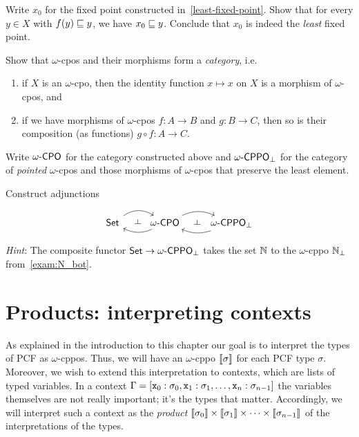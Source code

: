 \begin{exercise}\label{exer:least-fixed-point}
  Write \(x_0\) for the fixed point constructed in~\cref{least-fixed-point}.
  Show that for every \(y \in X\) with \(f(y) \sqsubseteq y\), we have \(x_0 \sqsubseteq y\).
  Conclude that \(x_0\) is indeed the \emph{least} fixed point.
\end{exercise}

\begin{exercise}\label{exer:category-of-cpos}
  Show that \(\omega\)-cpos and their morphisms form a \emph{category}, i.e.\
  \begin{enumerate}
  \item if \(X\) is an \(\omega\)-cpo, then the identity function
    \(x \mapsto x\) on \(X\) is a morphism of \(\omega\)-cpos, and
  \item if we have morphisms of \(\omega\)-cpos \(f \colon A \to B\) and
    \(g \colon B \to C\), then so is their composition (as functions)
    \(g \circ f \colon A \to C\).
  \end{enumerate}
\end{exercise}

\begin{exercise}\label{exer:adjunctions}

  Write \(\omegaCPO\) for the category constructed above and \(\omegaCPPObot\)
  for the category of \emph{pointed} \(\omega\)-cpos and those morphisms of
  \(\omega\)-cpos that preserve the least element.

  Construct adjunctions
  \[
  \begin{tikzcd}
    \Set
    \arrow[r, ""{name=F}, bend left=35] &
    \omegaCPO
    \arrow[l, ""{name=G}, bend left=25]
    \arrow[phantom, from=F, to=G, "\dashv" rotate=-90]
    \arrow[r, ""{name=F}, bend left=25] &
    \omegaCPPObot
    \arrow[l, ""{name=G}, bend left=20]
    \arrow[phantom, from=F, to=G, "\dashv" rotate=-90]
  \end{tikzcd}
\]
\emph{Hint}: The composite functor \(\Set \to \omegaCPPObot\) takes the set \(\mathbb N\) to
the \(\omega\)-cppo \(\mathbb N_\bot\) from~\cref{exam:N_bot}.
\end{exercise}

\section{Products: interpreting contexts}

As explained in the introduction to this chapter our goal is to interpret the
types of PCF as \(\omega\)-cppos. Thus, we will have an \(\omega\)-cppo
\(\llbracket\sigma\rrbracket\) for each PCF type \(\sigma\).
%
Moreover, we wish to extend this interpretation to contexts, which are lists of
typed variables. In a context
\(\Gamma = [\texttt x_0 : \sigma_0, \texttt x_1 : \sigma_1 , \dots , \texttt x_n :
\sigma_{n-1}]\) the variables themselves are not really important; it's the
types that matter. Accordingly, we will interpret such a context as the
\emph{product}
\(\llbracket\sigma_0\rrbracket \times \llbracket\sigma_1\rrbracket \times \cdots \times
\llbracket\sigma_{n-1}\rrbracket\) of the interpretations of the types.


